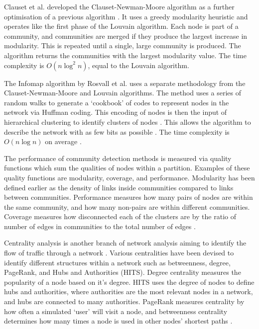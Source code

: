 Clauset et al. developed the Clauset-Newman-Moore algorithm as a further optimisation of a previous algorithm \cite{Clauset_Newman_Moore_2004}. It uses a greedy modularity heuristic and operates like the first phase of the Louvain algorithm. Each node is part of a community, and communities are merged if they produce the largest increase in modularity. This is repeated until a single, large community is produced. The algorithm returns the communities with the largest modularity value. The time complexity is $O(n \log^2 n)$, equal to the Louvain algorithm. \cite{Clauset_Newman_Moore_2004}


The Infomap algorithm by Rosvall et al. uses a separate methodology from the Clauset-Newman-Moore and Louvain algorithms. The method uses a series of random walks to generate a `cookbook' of codes to represent nodes in the network via Huffman coding. This encoding of nodes is then the input of hierarchical clustering to identify clusters of nodes \cite{infomap}. This allows the algorithm to describe the network with as few bits as possible \cite{lancichinetti_fortunato_2009}. The time complexity is $O(n \log n)$ on average \cite{infomap}.


The performance of community detection methods is measured via quality functions which sum the qualities of nodes within a partition. Examples of these quality functions are modularity, coverage, and performance. Modularity has been defined earlier as the density of links inside communities compared to links between communities. Performance measures how many pairs of nodes are within the same community, and how many non-pairs are within different communities. Coverage measures how disconnected each of the clusters are by the ratio of number of edges in communities to the total number of edges \cite{Fortunato_2010}. 


Centrality analysis is another branch of network analysis aiming to identify the flow of traffic through a network \cite{Borgatti_2005}. Various centralities have been devised to identify different structures within a network such as betweenness, degree, PageRank, and Hubs and Authorities (HITS). Degree centrality measures the popularity of a node based on it's degree. HITS uses the degree of nodes to define hubs and authorities, where authorities are the most relevant nodes in a network, and hubs are connected to many authorities. PageRank measures centrality by how often a simulated `user' will visit a node, and betweenness centrality determines how many times a node is used in other nodes' shortest paths \cite{Borgatti_2005, perra_fortunato_2008}. 

